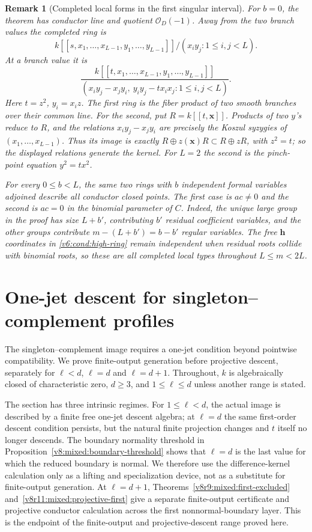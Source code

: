 \documentclass[10pt,fleqn]{article}
\numberwithin{equation}{section}
\newtheorem{remark}[theorem]{Remark}
\begin{document}
\begin{remark}[Completed local forms in the first singular interval]
\label{v6:cond:high-local}
For $b=0$, the theorem has conductor line and quotient
$\mathcal O_D(-1)$.  Away from the two branch values the completed ring is
\[
 k[[s,x_1,\ldots,x_{L-1},y_1,\ldots,y_{L-1}]]/(x_iy_j:1\le i,j<L).
\]
At a branch value it is
\[
 \frac{k[[t,x_1,\ldots,x_{L-1},y_1,\ldots,y_{L-1}]]}
 {(x_iy_j-x_jy_i,\ y_iy_j-tx_ix_j:1\le i,j<L)}.
\]
Here $t=z^2$, $y_i=x_iz$.  The first ring is the fiber product of two
smooth branches over their common line.  For the second, put
$R=k[[t,\mathbf x]]$.  Products of two $y$'s reduce to $R$, and the
relations $x_iy_j-x_jy_i$ are precisely the Koszul syzygies of
$(x_1,\ldots,x_{L-1})$.  Thus its image is exactly
$R\oplus z(\mathbf x)R\subset R\oplus zR$, with $z^2=t$;
so the displayed relations generate the kernel.  For $L=2$ the second is the pinch-point
equation $y^2=tx^2$.

For every $0\le b<L$, the same two rings with $b$ independent formal
variables adjoined describe all conductor closed points.  The first
case is $ac\ne0$ and the second is $ac=0$ in the binomial parameter
of $C$.  Indeed, the unique large group in the proof has size $L+b'$,
contributing $b'$ residual coefficient variables, and the other groups
contribute $m-(L+b')=b-b'$ regular variables.  The free $\mathbf h$
coordinates in \eqref{v6:cond:high-ring} remain independent when residual
roots collide with binomial roots, so these are all completed local
types throughout $L\le m<2L$.
\end{remark}

\section{One-jet descent for singleton--complement profiles}
\label{v7:sec:mixed-trace}

The singleton--complement image requires a one-jet condition beyond
pointwise compatibility.  We prove finite-output generation before
projective descent, separately for $\ell<d$, $\ell=d$ and $\ell=d+1$.
Throughout, $k$ is algebraically closed of characteristic zero,
$d\ge3$, and $1\le\ell\le d$ unless another range is stated.

The section has three intrinsic regimes.  For $1\le\ell<d$, the
actual image is described by a finite free one-jet descent algebra; at
$\ell=d$ the same first-order descent condition persists, but the natural
finite projection changes and $t$ itself no longer descends.  The boundary
normality threshold in Proposition~\ref{v8:mixed:boundary-threshold} shows
that $\ell=d$ is the last value for which the reduced boundary is normal.
We therefore use the difference-kernel calculation only as a lifting and
specialization device, not as a substitute for finite-output generation.
At $\ell=d+1$, Theorems~\ref{v8r9:mixed:first-excluded}
and~\ref{v8r11:mixed:projective-first} give a separate finite-output
certificate and projective conductor calculation across the first
nonnormal-boundary layer.  This is the endpoint of the finite-output and
projective-descent range proved here.
\end{document}
